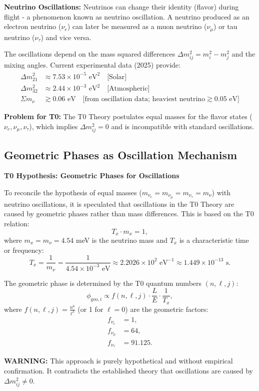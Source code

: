 	\begin{warning}
		\textbf{Neutrino Oscillations:} Neutrinos can change their identity (flavor) during flight - a phenomenon known as neutrino oscillation. A neutrino produced as an electron neutrino ($\nu_e$) can later be measured as a muon neutrino ($\nu_\mu$) or tau neutrino ($\nu_\tau$) and vice versa.
		
		The oscillations depend on the mass squared differences $\Delta m^2_{ij} = m_i^2 - m_j^2$ and the mixing angles. Current experimental data (2025) provide:
		\begin{align}
			\Delta m^2_{21} &\approx 7.53 \times 10^{-5} \text{ eV}^2 \quad \text{[Solar]} \\
			\Delta m^2_{32} &\approx 2.44 \times 10^{-3} \text{ eV}^2 \quad \text{[Atmospheric]} \\
			\Sigma m_\nu &\gtrsim 0.06 \text{ eV} \quad \text{[from oscillation data; heaviest neutrino} \gtrsim 0.05 \text{ eV]}
		\end{align}
		
		\textbf{Problem for T0:}
		The T0 Theory postulates equal masses for the flavor states ($\nu_e, \nu_\mu, \nu_\tau$), which implies $\Delta m^2_{ij} = 0$ and is incompatible with standard oscillations.
	\end{warning}
	
	\subsection{Geometric Phases as Oscillation Mechanism}
	
	\begin{speculation}
		\textbf{T0 Hypothesis: Geometric Phases for Oscillations}
		
		To reconcile the hypothesis of equal masses ($m_{\nu_e} = m_{\nu_\mu} = m_{\nu_\tau} = m_\nu$) with neutrino oscillations, it is speculated that oscillations in the T0 Theory are caused by geometric phases rather than mass differences. This is based on the T0 relation:
		\[
		T_x \cdot m_x = 1,
		\]
		where $m_x = m_\nu = 4.54$ meV is the neutrino mass and $T_x$ is a characteristic time or frequency:
		\[
		T_x = \frac{1}{m_\nu} = \frac{1}{4.54 \times 10^{-3} \text{ eV}} \approx 2.2026 \times 10^2 \text{ eV}^{-1} \approx 1.449 \times 10^{-13} \text{ s}.
		\]
		
		The geometric phase is determined by the T0 quantum numbers $(n, \ell, j)$:
		\[
		\phi_{\text{geo}, i} \propto f(n, \ell, j) \cdot \frac{L}{E} \cdot \frac{1}{T_x},
		\]
		where $f(n, \ell, j) = \frac{n^6}{\ell^3}$ (or 1 for $\ell = 0$) are the geometric factors:
		\begin{align}
			f_{\nu_e} &= 1, \\
			f_{\nu_\mu} &= 64, \\
			f_{\nu_\tau} &= 91.125.
		\end{align}
		
		\textbf{WARNING:} This approach is purely hypothetical and without empirical confirmation. It contradicts the established theory that oscillations are caused by $\Delta m^2_{ij} \neq 0$.
	\end{speculation}

